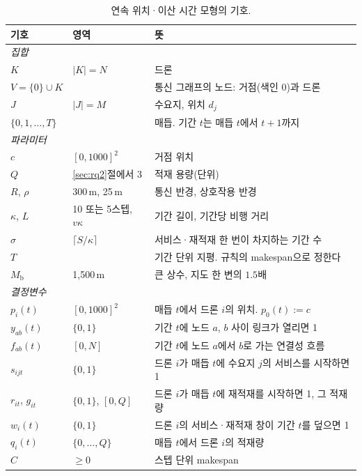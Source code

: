 \documentclass[final,5p,times,twocolumn]{elsarticle}
\begin{document}
\begin{table}[t]
\centering
\caption{연속 위치·이산 시간 모형의 기호.}
\label{tab:notation}
\small
\begin{tabular}{llp{9.6cm}}
\toprule
기호 & 영역 & 뜻 \\
\midrule
\multicolumn{3}{l}{\emph{집합}} \\
$K$ & $|K| = N$ & 드론 \\
$V = \{0\} \cup K$ & & 통신 그래프의 노드: 거점(색인 0)과 드론 \\
$J$ & $|J| = M$ & 수요지, 위치 $d_j$ \\
$\{0, 1, \dots, T\}$ & & 매듭. 기간 $t$는 매듭 $t$에서 $t+1$까지 \\
\midrule
\multicolumn{3}{l}{\emph{파라미터}} \\
$c$ & $[0,1000]^2$ & 거점 위치 \\
$Q$ & \ref{sec:rq2}절에서 3 & 적재 용량(단위) \\
$R$, $\rho$ & 300\,m, 25\,m & 통신 반경, 상호작용 반경 \\
$\kappa$, $L$ & 10 또는 5스텝, $v\kappa$ & 기간 길이, 기간당 비행 거리 \\
$\sigma$ & $\lceil S/\kappa \rceil$ & 서비스·재적재 한 번이 차지하는 기간 수 \\
$T$ & & 기간 단위 지평. 규칙의 makespan으로 정한다 \\
$M_{\mathrm{b}}$ & 1{,}500\,m & 큰 상수, 지도 한 변의 $1.5$배 \\
\midrule
\multicolumn{3}{l}{\emph{결정변수}} \\
$p_i(t)$ & $[0,1000]^2$ & 매듭 $t$에서 드론 $i$의 위치. $p_0(t) := c$ \\
$y_{ab}(t)$ & $\{0,1\}$ & 기간 $t$에 노드 $a$, $b$ 사이 링크가 열리면 1 \\
$f_{ab}(t)$ & $[0, N]$ & 기간 $t$에 노드 $a$에서 $b$로 가는 연결성 흐름 \\
$s_{ijt}$ & $\{0,1\}$ & 드론 $i$가 매듭 $t$에 수요지 $j$의 서비스를 시작하면 1 \\
$r_{it}$, $g_{it}$ & $\{0,1\}$, $[0,Q]$ & 드론 $i$가 매듭 $t$에 재적재를 시작하면 1, 그 적재량 \\
$w_i(t)$ & $\{0,1\}$ & 드론 $i$의 서비스·재적재 창이 기간 $t$를 덮으면 1 \\
$q_i(t)$ & $\{0,\dots,Q\}$ & 매듭 $t$에서 드론 $i$의 적재량 \\
$C$ & $\ge 0$ & 스텝 단위 makespan \\
\bottomrule
\end{tabular}
\end{table}
\end{document}
